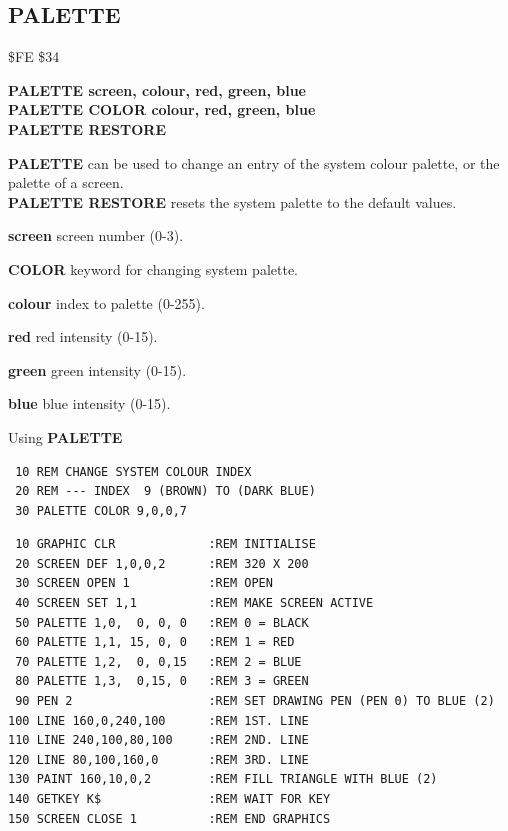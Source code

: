 \subsection{PALETTE}
\begin{description}[leftmargin=2cm,style=nextline]
\item [Token:] \$FE \$34
\item [Format:] {\bf PALETTE screen, colour, red, green, blue} \\
		{\bf PALETTE COLOR colour, red, green, blue} \\
                {\bf PALETTE RESTORE}
\item [Usage:]  {\bf PALETTE} can be used to change an
                entry of the system colour palette, or the palette
                of a screen. \\
                {\bf PALETTE RESTORE} resets the system palette to
                the default values.

                {\bf screen} screen number (0-3).

                {\bf COLOR} keyword for changing system palette.

                {\bf colour} index to palette (0-255).

                {\bf red} red intensity (0-15).

                {\bf green} green intensity (0-15).

                {\bf blue} blue intensity (0-15).

\item [Example:] Using {\bf PALETTE}

\begin{tcolorbox}[colback=black,coltext=white]
\verbatimfont{\codefont}
\begin{verbatim}
 10 REM CHANGE SYSTEM COLOUR INDEX
 20 REM --- INDEX  9 (BROWN) TO (DARK BLUE)
 30 PALETTE COLOR 9,0,0,7
\end{verbatim}
\end{tcolorbox}

\begin{tcolorbox}[colback=black,coltext=white]
\verbatimfont{\codefont}
\begin{verbatim}
 10 GRAPHIC CLR             :REM INITIALISE
 20 SCREEN DEF 1,0,0,2      :REM 320 X 200
 30 SCREEN OPEN 1           :REM OPEN
 40 SCREEN SET 1,1          :REM MAKE SCREEN ACTIVE
 50 PALETTE 1,0,  0, 0, 0   :REM 0 = BLACK
 60 PALETTE 1,1, 15, 0, 0   :REM 1 = RED
 70 PALETTE 1,2,  0, 0,15   :REM 2 = BLUE
 80 PALETTE 1,3,  0,15, 0   :REM 3 = GREEN
 90 PEN 2                   :REM SET DRAWING PEN (PEN 0) TO BLUE (2)
100 LINE 160,0,240,100      :REM 1ST. LINE
110 LINE 240,100,80,100     :REM 2ND. LINE
120 LINE 80,100,160,0       :REM 3RD. LINE
130 PAINT 160,10,0,2        :REM FILL TRIANGLE WITH BLUE (2)
140 GETKEY K$               :REM WAIT FOR KEY
150 SCREEN CLOSE 1          :REM END GRAPHICS
\end{verbatim}
\end{tcolorbox}
\end{description}

